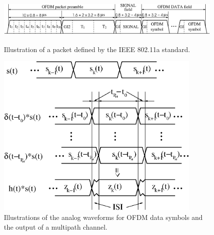 \documentclass[11pt,draftnofoot,onecolumn]{IEEEtran}
\def\spacingset#1{\def\baselinestretch{#1}\small\normalsize}
\begin{document}
\newpage



%


\newpage

\begin{figure}[t]
\centering
\includegraphics[height=1.0in]{fig/ofdmpacket_n.eps}
\caption{Illustration of a packet defined by the IEEE 802.11a standard.} %
\label{fig_sisopreamble}
\end{figure}

\begin{figure}[t]
\centering
\includegraphics[height=3.2in]{fig/fig_datawaveform.eps}
\caption{Illustrations of the analog waveforms for OFDM data symbols
and the output of a multipath channel.} \label{fig_siso_waveform}
\end{figure}
\end{document}
